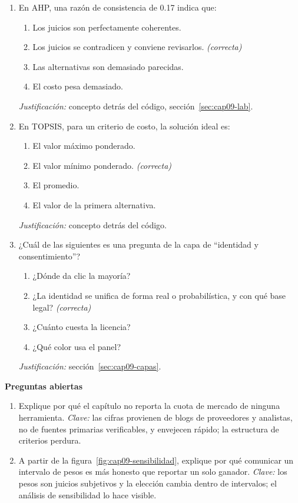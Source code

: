 \begin{enumerate}
  \item En AHP, una razón de consistencia de 0.17 indica que:
  \begin{enumerate}
    \item[a)] Los juicios son perfectamente coherentes.
    \item[b)] Los juicios se contradicen y conviene revisarlos. \textit{(correcta)}
    \item[c)] Las alternativas son demasiado parecidas.
    \item[d)] El costo pesa demasiado.
  \end{enumerate}
  \textit{Justificación:} concepto detrás del código, sección~\ref{sec:cap09-lab}.

  \item En TOPSIS, para un criterio de costo, la solución ideal es:
  \begin{enumerate}
    \item[a)] El valor máximo ponderado.
    \item[b)] El valor mínimo ponderado. \textit{(correcta)}
    \item[c)] El promedio.
    \item[d)] El valor de la primera alternativa.
  \end{enumerate}
  \textit{Justificación:} concepto detrás del código.

  \item ¿Cuál de las siguientes es una pregunta de la capa de
  \enquote{identidad y consentimiento}?
  \begin{enumerate}
    \item[a)] ¿Dónde da clic la mayoría?
    \item[b)] ¿La identidad se unifica de forma real o probabilística, y con qué base legal? \textit{(correcta)}
    \item[c)] ¿Cuánto cuesta la licencia?
    \item[d)] ¿Qué color usa el panel?
  \end{enumerate}
  \textit{Justificación:} sección~\ref{sec:cap09-capas}.
\end{enumerate}

\textbf{Preguntas abiertas}

\begin{enumerate}
  \item Explique por qué el capítulo no reporta la cuota de mercado de ninguna
  herramienta. \textit{Clave:} las cifras provienen de blogs de proveedores y
  analistas, no de fuentes primarias verificables, y envejecen rápido; la
  estructura de criterios perdura.
  \item A partir de la figura~\ref{fig:cap09-sensibilidad}, explique por qué
  comunicar un intervalo de pesos es más honesto que reportar un solo
  ganador. \textit{Clave:} los pesos son juicios subjetivos y la elección
  cambia dentro de intervalos; el análisis de sensibilidad lo hace visible.
\end{enumerate}


